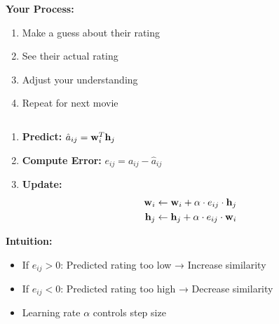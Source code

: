 \documentclass{beamer}
\begin{document}
\begin{frame}\begin{columns}[T]
\begin{column}{0.5\textwidth}
\textbf{Your Process:}
\begin{enumerate}[<+->]
    \item Make a guess about their rating
    \item See their actual rating
    \item Adjust your understanding
    \item Repeat for next movie
\end{enumerate}
\end{column}
\begin{column}{0.5\textwidth}
\end{column}
\end{columns}
\end{frame}

\begin{frame}\begin{enumerate}[<+->]
    \item \textbf{Predict:} $\hat{a}_{ij} = \mathbf{w}_i^T \mathbf{h}_j$
    \item \textbf{Compute Error:} $e_{ij} = a_{ij} - \hat{a}_{ij}$  
    \item \textbf{Update:}
    \begin{align}
    \mathbf{w}_i &\leftarrow \mathbf{w}_i + \alpha \cdot e_{ij} \cdot \mathbf{h}_j \\
    \mathbf{h}_j &\leftarrow \mathbf{h}_j + \alpha \cdot e_{ij} \cdot \mathbf{w}_i
    \end{align}
\end{enumerate}

\pause
\textbf{Intuition:}
\begin{itemize}
\item If $e_{ij} > 0$: Predicted rating too low → Increase similarity
    \item If $e_{ij} < 0$: Predicted rating too high → Decrease similarity
    \pause
\item Learning rate $\alpha$ controls step size
\end{itemize}
\end{frame}
\end{document}
